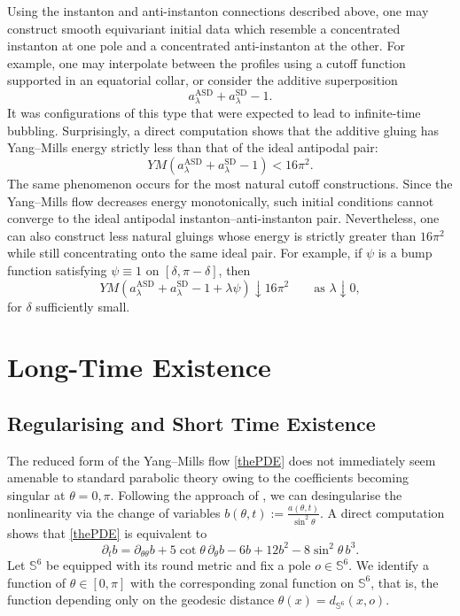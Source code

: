 \documentclass[11pt,a4paper]{article}
\numberwithin{equation}{section}
\theoremstyle{plain}
\theoremstyle{remark}
\begin{document}
Using the instanton and anti-instanton connections described above,
one may construct smooth equivariant initial data which resemble a
concentrated instanton at one pole and a concentrated anti-instanton at
the other. For example, one may interpolate between the profiles using a
cutoff function supported in an equatorial collar, or consider the
additive superposition
$$
a^{\mathrm{ASD}}_\lambda+a^{\mathrm{SD}}_\lambda-1.
$$
It was configurations of this type that were expected to lead to
infinite-time bubbling. Surprisingly, a direct computation shows that the
additive gluing has Yang--Mills energy strictly less than that of the
ideal antipodal pair:
$$
YM(a^{\mathrm{ASD}}_\lambda+a^{\mathrm{SD}}_\lambda-1)
<
16\pi^2.
$$
The same phenomenon occurs for the most natural cutoff constructions. Since the Yang--Mills flow decreases energy monotonically, such initial conditions cannot converge to the
ideal antipodal instanton--anti-instanton pair.
Nevertheless, one can also construct less natural gluings whose energy is strictly greater than $16\pi^2$
while still concentrating onto the same ideal pair. For example, if
$\psi$ is a bump function satisfying $\psi\equiv1$ on
$[\delta,\pi-\delta]$, then
$$
YM\!\left(
a^{\mathrm{ASD}}_\lambda
+
a^{\mathrm{SD}}_\lambda
-
1
+
\lambda\psi
\right)
\downarrow 16\pi^2
\qquad
\text{as }\lambda\downarrow0,
$$
for $\delta$ sufficiently small.


\section{Long-Time Existence}

\subsection{Regularising and Short Time Existence}
The reduced form of the Yang--Mills flow \eqref{thePDE} does not immediately seem amenable to standard parabolic theory owing to the coefficients becoming singular at $\theta=0,\pi$. Following the approach of \cite{67fa8f92-32f2-39c3-bd3f-c407da60a7c7}, \cite{Waldron2014Thesis} we can desingularise the nonlinearity via the change of variables $b(\theta,t):=\frac{a(\theta,t)}{\sin^2\theta}$. A direct computation shows that \eqref{thePDE} is equivalent to
\begin{equation}\label{beqn}
\partial_t b
=
\partial_{\theta\theta}b
+
5\cot\theta\,\partial_\theta b
-6b
+12b^2
-8\sin^2\theta\,b^3.
\end{equation}
Let $\mathbb{S}^6$ be equipped with its round metric and fix a pole $o\in\mathbb{S}^6$. We identify a function of $\theta\in[0,\pi]$ with the corresponding zonal function on $\mathbb{S}^6$, that is, the function depending only on the geodesic distance $\theta(x)=d_{\mathbb{S}^6}(x,o)$.
\end{document}
